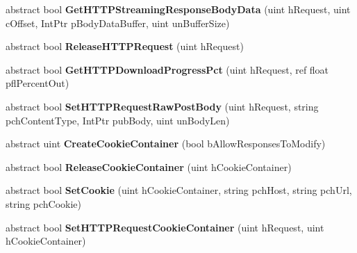 \begin{DoxyCompactItemize}
\item 
\hypertarget{classValve_1_1Steamworks_1_1ISteamHTTP_afab00e3e6e32350ac2266271fa18ca49}{}abstract bool {\bfseries Get\+H\+T\+T\+P\+Streaming\+Response\+Body\+Data} (uint h\+Request, uint c\+Offset, Int\+Ptr p\+Body\+Data\+Buffer, uint un\+Buffer\+Size)\label{classValve_1_1Steamworks_1_1ISteamHTTP_afab00e3e6e32350ac2266271fa18ca49}

\item 
\hypertarget{classValve_1_1Steamworks_1_1ISteamHTTP_a06a078758d648454c8cc789c199976b9}{}abstract bool {\bfseries Release\+H\+T\+T\+P\+Request} (uint h\+Request)\label{classValve_1_1Steamworks_1_1ISteamHTTP_a06a078758d648454c8cc789c199976b9}

\item 
\hypertarget{classValve_1_1Steamworks_1_1ISteamHTTP_a468e5fcaebdf637f301b398ab617c189}{}abstract bool {\bfseries Get\+H\+T\+T\+P\+Download\+Progress\+Pct} (uint h\+Request, ref float pfl\+Percent\+Out)\label{classValve_1_1Steamworks_1_1ISteamHTTP_a468e5fcaebdf637f301b398ab617c189}

\item 
\hypertarget{classValve_1_1Steamworks_1_1ISteamHTTP_a8e337468e847388bed731a172f63ef4b}{}abstract bool {\bfseries Set\+H\+T\+T\+P\+Request\+Raw\+Post\+Body} (uint h\+Request, string pch\+Content\+Type, Int\+Ptr pub\+Body, uint un\+Body\+Len)\label{classValve_1_1Steamworks_1_1ISteamHTTP_a8e337468e847388bed731a172f63ef4b}

\item 
\hypertarget{classValve_1_1Steamworks_1_1ISteamHTTP_a4dee39a058db0d38f41569591ef1387e}{}abstract uint {\bfseries Create\+Cookie\+Container} (bool b\+Allow\+Responses\+To\+Modify)\label{classValve_1_1Steamworks_1_1ISteamHTTP_a4dee39a058db0d38f41569591ef1387e}

\item 
\hypertarget{classValve_1_1Steamworks_1_1ISteamHTTP_aae333bc60a83754bb18b5c1d15514ab0}{}abstract bool {\bfseries Release\+Cookie\+Container} (uint h\+Cookie\+Container)\label{classValve_1_1Steamworks_1_1ISteamHTTP_aae333bc60a83754bb18b5c1d15514ab0}

\item 
\hypertarget{classValve_1_1Steamworks_1_1ISteamHTTP_aab78173a82cbfd0a989e7457c6d1632c}{}abstract bool {\bfseries Set\+Cookie} (uint h\+Cookie\+Container, string pch\+Host, string pch\+Url, string pch\+Cookie)\label{classValve_1_1Steamworks_1_1ISteamHTTP_aab78173a82cbfd0a989e7457c6d1632c}

\item 
\hypertarget{classValve_1_1Steamworks_1_1ISteamHTTP_a6633d485f3eb8d28a04fb114ab3ece6d}{}abstract bool {\bfseries Set\+H\+T\+T\+P\+Request\+Cookie\+Container} (uint h\+Request, uint h\+Cookie\+Container)\label{classValve_1_1Steamworks_1_1ISteamHTTP_a6633d485f3eb8d28a04fb114ab3ece6d}


\end{DoxyCompactItemize}
